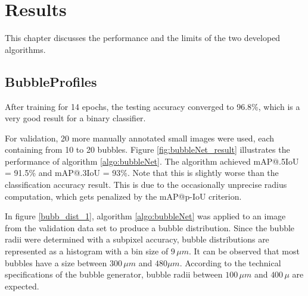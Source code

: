 \chapter{Results}\label{results}
	This chapter discusses the performance and the limits of the two developed algorithms.
	
		\section{BubbleProfiles}\label{result_profiles}
			
			After training for 14 epochs, the testing accuracy converged to 96.8\%, which is a very good result for a binary classifier. 

			For validation, 20 more manually annotated small images were used, each containing from 10 to 20 bubbles. Figure \ref{fig:bubbleNet_result} illustrates the performance of algorithm \ref{algo:bubbleNet}.  
			The algorithm achieved mAP@.5IoU = 91.5\% and mAP@.3IoU = 93\%. Note that this is slightly worse than the classification accuracy result. This is due to the occasionally unprecise radius computation, which gets penalized by the mAP@p-IoU criterion. 
			
			In figure \ref{bubb_dist_1}, algorithm \ref{algo:bubbleNet} was applied to an image from the validation data set to produce a bubble distribution. Since the bubble radii were determined with a subpixel accuracy, bubble distributions are represented as a histogram with a bin size of $9 \, \mu m$. It can be observed that most bubbles have a size between $300 \, \mu m$ and $480 \mu m$. According to the technical specifications of the bubble generator, bubble radii between $100 \, \mu m$ and $400 \, \mu$ are expected. 
			
